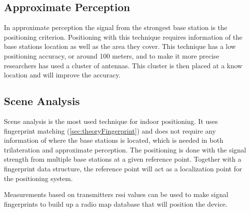 \subsection{Approximate Perception}\label{sec:theoryRssiApproxPerception}
In approximate perception the signal from the strongest base station is the positioning criterion.
Positioning with this technique requires information of the base stations location as well as the area they cover. 
This technique has a low positioning accuracy, or around 100 meters, and to make it more precise researchers has used a cluster of antennas.
This cluster is then placed at a know location and will improve the accuracy.
\cite{IndoorFingerprintPositioning2017} 

\subsection{Scene Analysis}\label{sec:theoryRssiSceneAnalysis}
Scene analysis is the most used technique for indoor positioning.
It uses fingerprint matching (\cref{sec:theoryFingerprint}) and does not require any information of where the base stations is located, which is needed in both trilateration and approximate perception.
The positioning is done with the signal strength from multiple base stations at a given reference point.
Together with a fingerprint data structure, the reference point will act as a localization point for the positioning system.\cite{IndoorFingerprintPositioning2017} 

\bigskip

Measurements based on transmitters \acrshort{rssi} values can be used to make signal fingerprints to build up a radio map database that will position the device.\cite{DevelopmentMobileIndoor2017} 
